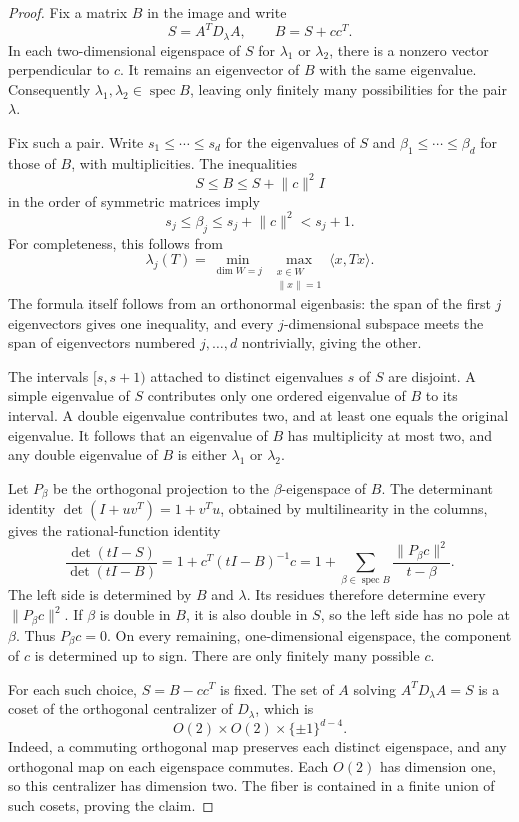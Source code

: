\documentclass[11pt,reqno]{amsart}
\theoremstyle{definition}
\theoremstyle{remark}
\numberwithin{equation}{section}
\newcommand{\ip}[2]{\langle #1,#2\rangle}
\newcommand{\norm}[1]{\lVert #1\rVert}
\DeclareMathOperator{\spec}{spec}
\begin{document}
\begin{proof}
Fix a matrix $B$ in the image and write
\[
 S=A^TD_\lambda A,\qquad B=S+cc^T.
\]
In each two-dimensional eigenspace of $S$ for $\lambda_1$ or
$\lambda_2$, there is a nonzero vector perpendicular to $c$.
It remains an eigenvector of $B$ with the same eigenvalue.
Consequently $\lambda_1,\lambda_2\in\spec B$, leaving only finitely
many possibilities for the pair $\lambda$.

Fix such a pair. Write $s_1\leq\cdots\leq s_d$ for the eigenvalues
of $S$ and $\beta_1\leq\cdots\leq\beta_d$ for those of $B$,
with multiplicities. The inequalities
\[
 S\leq B\leq S+\norm c^2I
\]
in the order of symmetric matrices imply
\begin{equation}\label{eq:eigen-bounds}
 s_j\leq\beta_j\leq s_j+\norm c^2<s_j+1.
\end{equation}
For completeness, this follows from
\[
 \lambda_j(T)=\min_{\dim W=j}\ 
              \max_{\substack{x\in W\\\norm x=1}}\ip{x}{Tx}.
\]
The formula itself follows from an orthonormal eigenbasis: the span
of the first $j$ eigenvectors gives one inequality, and every
$j$-dimensional subspace meets the span of eigenvectors numbered
$j,\ldots,d$ nontrivially, giving the other.

The intervals $[s,s+1)$ attached to distinct eigenvalues $s$ of $S$
are disjoint. A simple eigenvalue of $S$ contributes only one ordered
eigenvalue of $B$ to its interval. A double eigenvalue contributes two,
and at least one equals the original eigenvalue. It follows that an
eigenvalue of $B$ has multiplicity at most two, and any double
eigenvalue of $B$ is either $\lambda_1$ or $\lambda_2$.

Let $P_\beta$ be the orthogonal projection to the $\beta$-eigenspace
of $B$. The determinant identity $\det(I+uv^T)=1+v^Tu$, obtained
by multilinearity in the columns, gives the rational-function identity
\begin{equation}\label{eq:secular}
 \frac{\det(tI-S)}{\det(tI-B)}
 =1+c^T(tI-B)^{-1}c
 =1+\sum_{\beta\in\spec B}
       \frac{\norm{P_\beta c}^2}{t-\beta}.
\end{equation}
The left side is determined by $B$ and $\lambda$. Its residues
therefore determine every $\norm{P_\beta c}^2$.
If $\beta$ is double in $B$, it is also double in $S$, so the left
side has no pole at $\beta$. Thus $P_\beta c=0$. On every remaining,
one-dimensional eigenspace, the component of $c$ is determined up
to sign. There are only finitely many possible $c$.

For each such choice, $S=B-cc^T$ is fixed. The set of $A$ solving
$A^TD_\lambda A=S$ is a coset of the orthogonal centralizer of
$D_\lambda$, which is
\[
 O(2)\times O(2)\times\{\pm1\}^{d-4}.
\]
Indeed, a commuting orthogonal map preserves each distinct eigenspace,
and any orthogonal map on each eigenspace commutes. Each $O(2)$
has dimension one, so this centralizer has dimension two. The
fiber is contained in a finite union of such cosets, proving the
claim.
\end{proof}
\end{document}
